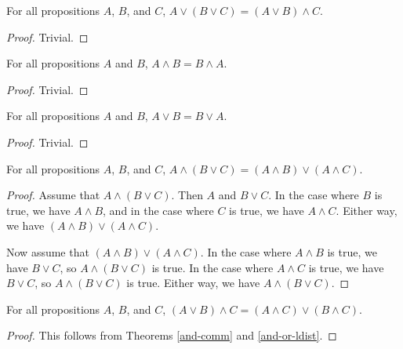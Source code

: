 \documentclass[../math.tex]{subfiles}
\begin{document}
\begin{theorem} \label{or-assoc}
    For all propositions $A$, $B$, and $C$, $A \vee (B \vee C) = (A \vee B)
    \wedge C$.
\end{theorem}
\begin{proof}
    Trivial.
\end{proof}

\begin{theorem} \label{and-comm}
    For all propositions $A$ and $B$, $A \wedge B = B \wedge A$.
\end{theorem}
\begin{proof}
    Trivial.
\end{proof}

\begin{theorem} \label{or-comm}
    For all propositions $A$ and $B$, $A \vee B = B \vee A$.
\end{theorem}
\begin{proof}
    Trivial.
\end{proof}

\begin{theorem} \label{and-or-ldist}
    For all propositions $A$, $B$, and $C$, $A \wedge (B \vee C) = (A \wedge B)
    \vee (A \wedge C)$.
\end{theorem}
\begin{proof}
    Assume that $A \wedge (B \vee C)$.  Then $A$ and $B \vee C$.  In the case
    where $B$ is true, we have $A \wedge B$, and in the case where $C$ is true,
    we have $A \wedge C$.  Either way, we have $(A \wedge B) \vee (A \wedge C)$.

    Now assume that $(A \wedge B) \vee (A \wedge C)$.  In the case where $A
    \wedge B$ is true, we have $B \vee C$, so $A \wedge (B \vee C)$ is true.  In
    the case where $A \wedge C$ is true, we have $B \vee C$, so $A \wedge (B
    \vee C)$ is true.  Either way, we have $A \wedge (B \vee C)$.
\end{proof}

\begin{theorem} \label{and-or-rdist}
    For all propositions $A$, $B$, and $C$, $(A \vee B) \wedge C = (A \wedge C)
    \vee (B \wedge C)$.
\end{theorem}
\begin{proof}
    This follows from Theorems \ref{and-comm} and \ref{and-or-ldist}.
\end{proof}
\end{document}
